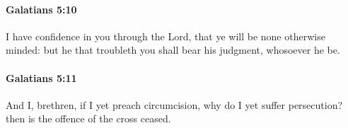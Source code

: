		\paragraph{Galatians 5:10} %
			\label{GALATIANS-5-10}

			I have confidence in you through the Lord, that ye will be none otherwise minded: but he that troubleth you shall bear his judgment, whosoever he be.

			\begin{framed}
			\scriptsize
				\begin{compactdesc}
					\item[SBLG] 
				\end{compactdesc}
			\end{framed}

		\paragraph{Galatians 5:11} %
			\label{GALATIANS-5-11}

			And I, brethren, if I yet preach circumcision, why do I yet suffer persecution?  then is the offence of the cross ceased.

